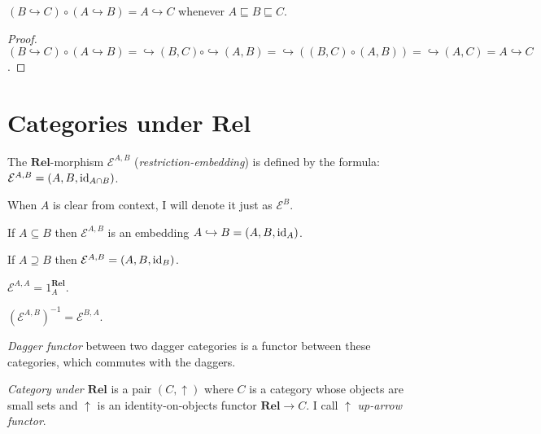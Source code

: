 \begin{prop}
  $(B \hookrightarrow C) \circ (A \hookrightarrow B) = A \hookrightarrow C$
  whenever $A \sqsubseteq B \sqsubseteq C$.
\end{prop}

\begin{proof}
  $(B \hookrightarrow C) \circ (A \hookrightarrow B) = \hookrightarrow (B , C)
  \circ \hookrightarrow (A , B) = \hookrightarrow ((B , C) \circ (A , B)) =
  \hookrightarrow (A , C) = A \hookrightarrow C$.
\end{proof}

\section{\texorpdfstring{Categories under $\mathbf{Rel}$}{Categories under Rel}}

\begin{defn}
  The $\mathbf{Rel}$-morphism $\mathcal{E}^{A,B}$
  (\emph{restriction-embedding}) is defined by the formula: $\mathcal{E}^{A,B}
  = (A , B , \operatorname{id}_{A \cap B})$.
  
  When $A$ is clear from context, I will denote it just as $\mathcal{E}^B$.
\end{defn}

\begin{obvious}
If $A \subseteq B$ then $\mathcal{E}^{A,B}$ is an embedding $A \hookrightarrow B
= (A , B , \operatorname{id}_A)$.
\end{obvious}

\begin{obvious}
If $A \supseteq B$ then $\mathcal{E}^{A,B} = (A , B ,
\operatorname{id}_B)$.
\end{obvious}

\begin{obvious}
$\mathcal{E}^{A,A} = 1^{\mathbf{Rel}}_A$.
\end{obvious}

\begin{obvious}
$(\mathcal{E}^{A,B})^{- 1} = \mathcal{E}^{B,A}$.
\end{obvious}

\begin{defn}
\emph{Dagger functor} between two dagger categories is a functor between
these categories, which commutes with the daggers.
\end{defn}

\begin{defn}
\emph{Category under $\mathbf{Rel}$} is a pair $(C , \uparrow)$
where $C$ is a category whose objects are small sets and $\uparrow$ is an
identity-on-objects functor $\mathbf{Rel} \rightarrow C$. I call
$\uparrow$ \emph{up-arrow functor}.
\end{defn}

